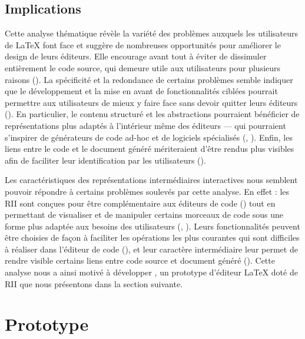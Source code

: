 \subsection{Implications}
Cette analyse thématique révèle la variété des problèmes auxquels les utilisateurs de \LaTeX{} font face et suggère de nombreuses opportunités pour améliorer le design de leurs éditeurs.
Elle encourage avant tout à éviter de dissimuler entièrement le code source, qui demeure utile aux utilisateurs pour plusieurs raisons ().
La spécificité et la redondance de certains problèmes semble indiquer que le développement et la mise en avant de fonctionnalités ciblées pourrait permettre aux utilisateurs de mieux y faire face sans devoir quitter leurs éditeurs ().
En particulier, le contenu structuré et les abstractions pourraient bénéficier de représentations plus adaptés à l'intérieur même des éditeurs --- qui pourraient s'inspirer de générateurs de code ad-hoc et de logiciels spécialisés (, ).
Enfin, les liens entre le code et le document généré mériteraient d'être rendus plus visibles afin de faciliter leur identification par les utilisateurs ().

Les caractéristiques des représentations intermédiaires interactives nous semblent pouvoir répondre à certains problèmes soulevés par cette analyse.
En effet : les RII sont conçues pour être complémentaire aux éditeurs de code () tout en permettant de visualiser et de manipuler certains morceaux de code sous une forme plus adaptée aux besoins des utilisateurs (, ).
Leurs fonctionnalités peuvent être choisies de façon à faciliter les opérations les plus courantes qui sont difficiles à réaliser dans l'éditeur de code (), et leur caractère intermédiaire leur permet de rendre visible certains liens entre code source et document généré ().
Cette analyse nous a ainsi motivé à développer \iLaTeX{}, un prototype d'éditeur \LaTeX{} doté de RII que nous présentons dans la section suivante.





\section{Prototype}
\label{sec:prototype}

